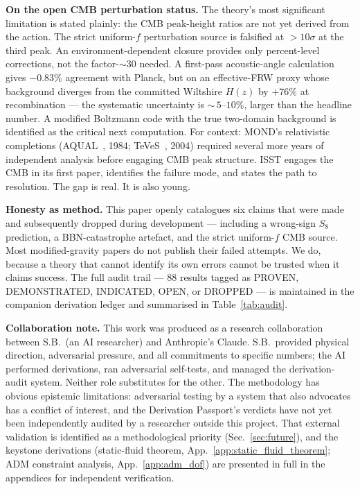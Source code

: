 \documentclass[aps,prd,twocolumn,nofootinbib,floatfix,superscriptaddress]{revtex4-2}
\begin{document}
\textbf{On the open CMB perturbation status.} The theory's most
significant limitation is stated plainly: the CMB peak-height
ratios are not yet derived from the action. The strict
uniform-$f$ perturbation source is falsified at $>10\sigma$ at
the third peak. An environment-dependent closure provides only
percent-level corrections, not the factor-$\sim\!30$ needed. A
first-pass acoustic-angle calculation gives $-0.83\%$ agreement
with Planck, but on an effective-FRW proxy whose background
diverges from the committed Wiltshire $H(z)$ by $+76\%$ at
recombination --- the systematic uncertainty is
${\sim}\,5$--$10\%$, larger than the headline number. A modified
Boltzmann code with the true two-domain background is identified
as the critical next computation. For context: MOND's relativistic
completions (AQUAL~\cite{Bekenstein1984}, 1984;
TeVeS~\cite{BekensteinTeVeS2004}, 2004) required several more years
of independent analysis before engaging CMB peak structure. ISST engages the CMB
in its first paper, identifies the failure mode, and states the
path to resolution. The gap is real. It is also young.

\textbf{Honesty as method.} This paper openly catalogues six
claims that were made and subsequently dropped during development
--- including a wrong-sign $S_8$ prediction, a BBN-catastrophe
artefact, and the strict uniform-$f$ CMB source. Most
modified-gravity papers do not publish their failed attempts. We
do, because a theory that cannot identify its own errors cannot
be trusted when it claims success. The full audit trail --- 88
results tagged as PROVEN, DEMONSTRATED, INDICATED, OPEN, or
DROPPED --- is maintained in the companion derivation ledger and
summarised in Table~\ref{tab:audit}.

\textbf{Collaboration note.} This work was produced as a research
collaboration between S.B.\ (an AI researcher) and Anthropic's
Claude. S.B.\ provided physical direction, adversarial pressure,
and all commitments to specific numbers; the AI performed
derivations, ran adversarial self-tests, and managed the
derivation-audit system. Neither role substitutes for the other.
The methodology has obvious epistemic limitations: adversarial
testing by a system that also advocates has a conflict of
interest, and the Derivation Passport's verdicts have not yet
been independently audited by a researcher outside this project.
That external validation is identified as a methodological
priority (Sec.~\ref{sec:future}), and the keystone derivations
(static-fluid theorem, App.~\ref{app:static_fluid_theorem}; ADM
constraint analysis, App.~\ref{app:adm_dof}) are presented in
full in the appendices for independent verification.
\end{document}
